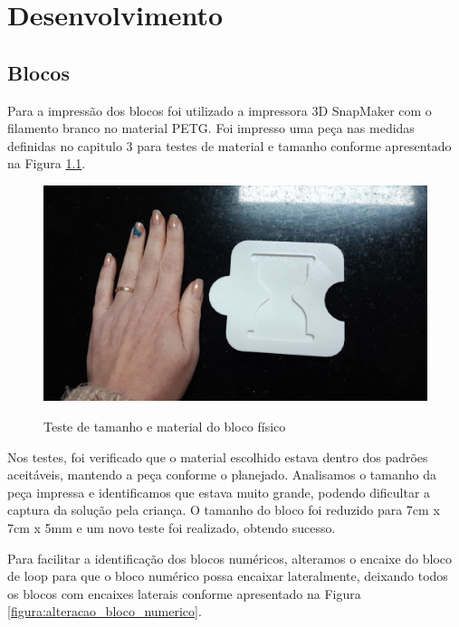 \chapter{Desenvolvimento} \label{cap:desenvolvimento}

\section{Blocos}

    Para a impressão dos blocos foi utilizado a impressora 3D SnapMaker com o filamento branco no material PETG. Foi impresso uma peça nas medidas definidas no capitulo 3 para testes de material e tamanho conforme apresentado na Figura \ref{figura:teste_bloco}.
    
    \begin{figure}[H]
        \caption{Teste de tamanho e material do bloco físico}
        \centering
        \includegraphics[width=\linewidth]{Imagens/Cap4/teste_bloco.jpeg}
        \label{figura:teste_bloco}
    \end{figure}
    
    Nos testes, foi verificado que o material escolhido estava dentro dos padrões aceitáveis, mantendo a peça conforme o planejado. Analisamos o tamanho da peça impressa e identificamos que estava muito grande, podendo dificultar a captura da solução pela criança. O tamanho do bloco foi reduzido para 7cm x 7cm x 5mm e um novo teste foi realizado, obtendo sucesso.
    
    Para facilitar a identificação dos blocos numéricos, alteramos o encaixe  do bloco de loop para que o bloco numérico possa encaixar lateralmente, deixando todos os blocos com encaixes laterais conforme apresentado na Figura \ref{figura:alteracao_bloco_numerico}.
    
